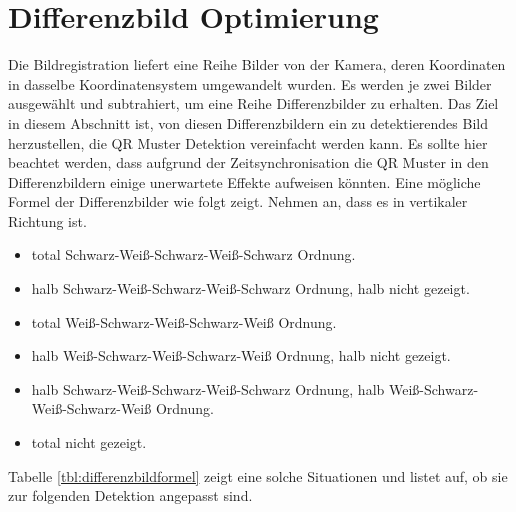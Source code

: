 \section{Differenzbild Optimierung}
Die Bildregistration liefert eine Reihe Bilder von der Kamera, deren Koordinaten in dasselbe Koordinatensystem umgewandelt wurden. Es werden je zwei Bilder ausgewählt und subtrahiert, um eine Reihe Differenzbilder zu erhalten. Das Ziel in diesem Abschnitt ist, von diesen Differenzbildern ein zu detektierendes Bild herzustellen, die QR Muster Detektion vereinfacht werden kann. Es sollte hier beachtet werden, dass aufgrund der Zeitsynchronisation die QR Muster in den Differenzbildern einige unerwartete Effekte aufweisen könnten. Eine mögliche Formel der Differenzbilder wie folgt zeigt. Nehmen an, dass es in vertikaler Richtung ist.

\begin{itemize}
	\item total Schwarz-Weiß-Schwarz-Weiß-Schwarz Ordnung.
	\item halb Schwarz-Weiß-Schwarz-Weiß-Schwarz Ordnung, halb nicht gezeigt.
	\item total Weiß-Schwarz-Weiß-Schwarz-Weiß Ordnung.
	\item halb Weiß-Schwarz-Weiß-Schwarz-Weiß Ordnung, halb nicht gezeigt.
	\item halb Schwarz-Weiß-Schwarz-Weiß-Schwarz Ordnung, halb Weiß-Schwarz-Weiß-Schwarz-Weiß Ordnung.
	\item total nicht gezeigt.
\end{itemize}

Tabelle \ref{tbl:differenzbildformel} zeigt eine solche Situationen und listet auf, ob sie zur folgenden Detektion angepasst sind.

